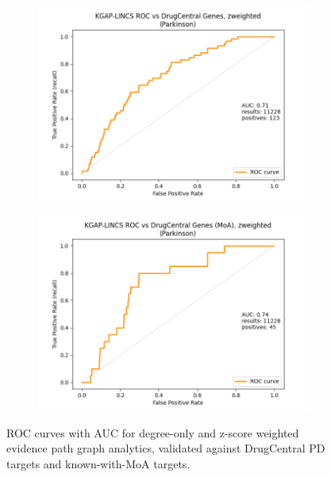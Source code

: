 \begin{figure}[h]
\begin{subfigure}{0.5\textwidth}
\includegraphics[width=0.95\linewidth]{figures/kgap/KGAP-LINCS_ROC_zweighted_Parkinson.png} 
\caption{}
\label{fig:KGAP-LINCS_ROCsc}
\end{subfigure}
\begin{subfigure}{0.5\textwidth}
\includegraphics[width=0.95\linewidth]{figures/kgap/KGAP-LINCS_ROC_zweighted_MoA_Parkinson.png}
\caption{}
\label{fig:KGAP-LINCS_ROCsd}
\end{subfigure}

\caption{ROC curves with AUC for degree-only and z-score weighted evidence path graph analytics, validated against DrugCentral PD targets and known-with-MoA targets.}
\label{fig:KGAP-LINCS_ROCs}
\end{figure}

